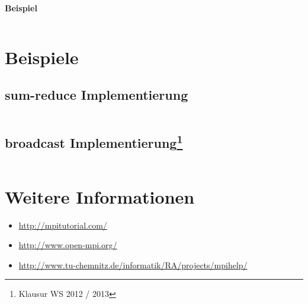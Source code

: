 \textbf{Beispiel}
\inputminted[numbersep=5pt, tabsize=4]{c}{scripts/mpi/mpi-reduce-example.c}

\section{Beispiele}
\subsection{sum-reduce Implementierung}
\inputminted[numbersep=5pt, tabsize=4]{c}{scripts/mpi/mpi-sum-reduce.c}

\subsection[broadcast Implementierung]{broadcast Implementierung\footnote{Klausur WS 2012 / 2013}}
\inputminted[numbersep=5pt, tabsize=4]{c}{scripts/mpi/mpi-mybroadcast.c}

\section{Weitere Informationen}
\begin{itemize}
    \item \url{http://mpitutorial.com/}
    \item \url{http://www.open-mpi.org/}
    \item \url{http://www.tu-chemnitz.de/informatik/RA/projects/mpihelp/}
\end{itemize}

